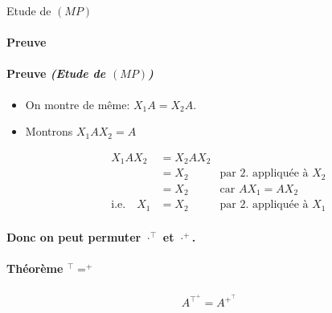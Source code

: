 \documentclass{article}
\newenvironment{theorem}[1][\unskip]{
	\paragraph{Théorème #1}

}{}
\newenvironment{proof}[1][\unskip]{
	\def\temp{#1}\ifx\temp\empty
		\paragraph{Preuve}
	\else
		\paragraph{Preuve \emph{(#1)}}
	\fi

}{}
\begin{document}
\begin{proof}[Etude de $(MP)$]
\begin{itemize}
        \item On montre de même: $X_1 A = X_2 A$.

    \item Montrons $X_1 A X_2 = A$

        \begin{align*}
            X_1A X_2 &= X_2 A X_2 \\
            &= X_2 \quad&\text{par 2. appliquée à $X_2$} \\
            &= X_2 \quad&\text{car $AX_1 = AX_2$} \\
            \text{i.e.}\quad X_1 &= X_2 \quad&\text{par 2. appliquée à $X_1$} \\
        \end{align*}
\end{itemize}


{\bf Donc on peut permuter $ \cdot ^\top$ et $ \cdot ^+$.}

\end{proof}

\begin{theorem}[$^\top = ^+$]
    \begin{align*}
        A^\top ^+ = A^+ ^\top
    \end{align*}
\end{theorem}
\end{document}
